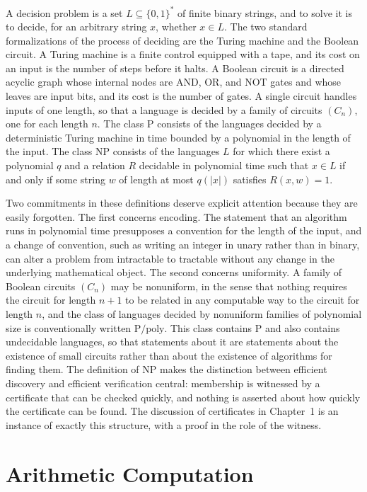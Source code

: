 \documentclass[11pt,letterpaper]{report}
\theoremstyle{plain}
\theoremstyle{definition}
\theoremstyle{remark}
\newcommand{\PTIME}{\mathrm{P}}
\newcommand{\NP}{\mathrm{NP}}
\begin{document}
A decision problem is a set $L\subseteq\{0,1\}^{*}$ of finite binary strings, and to solve it is to decide, for an arbitrary string $x$, whether $x\in L$. The two standard formalizations of the process of deciding are the Turing machine and the Boolean circuit. A Turing machine is a finite control equipped with a tape, and its cost on an input is the number of steps before it halts. A Boolean circuit is a directed acyclic graph whose internal nodes are AND, OR, and NOT gates and whose leaves are input bits, and its cost is the number of gates. A single circuit handles inputs of one length, so that a language is decided by a family of circuits $(C_n)$, one for each length $n$. The class $\PTIME$ consists of the languages decided by a deterministic Turing machine in time bounded by a polynomial in the length of the input. The class $\NP$ consists of the languages $L$ for which there exist a polynomial $q$ and a relation $R$ decidable in polynomial time such that $x\in L$ if and only if some string $w$ of length at most $q(|x|)$ satisfies $R(x,w)=1$.

Two commitments in these definitions deserve explicit attention because they are easily forgotten. The first concerns encoding. The statement that an algorithm runs in polynomial time presupposes a convention for the length of the input, and a change of convention, such as writing an integer in unary rather than in binary, can alter a problem from intractable to tractable without any change in the underlying mathematical object. The second concerns uniformity. A family of Boolean circuits $(C_n)$ may be nonuniform, in the sense that nothing requires the circuit for length $n+1$ to be related in any computable way to the circuit for length $n$, and the class of languages decided by nonuniform families of polynomial size is conventionally written $\PTIME/\mathrm{poly}$. This class contains $\PTIME$ and also contains undecidable languages, so that statements about it are statements about the existence of small circuits rather than about the existence of algorithms for finding them. The definition of $\NP$ makes the distinction between efficient discovery and efficient verification central: membership is witnessed by a certificate that can be checked quickly, and nothing is asserted about how quickly the certificate can be found. The discussion of certificates in Chapter~1 is an instance of exactly this structure, with a proof in the role of the witness.

\section{Arithmetic Computation}
\end{document}
